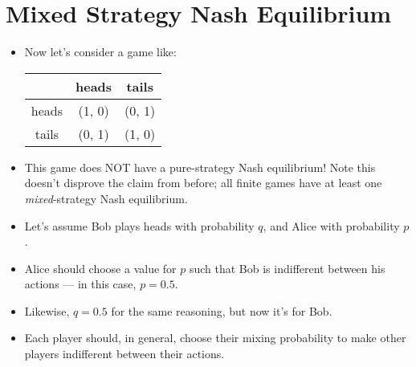 \documentclass{article}
\begin{document}
\section{Mixed Strategy Nash Equilibrium}
\begin{itemize}
    \item Now let's consider a game like:
        \begin{table}[h!]
            \centering
            \begin{tabular}{|c|c|c|}
            \hline
                  & heads  & tails  \\ \hline
            heads & (1, 0) & (0, 1) \\ \hline
            tails & (0, 1) & (1, 0) \\ \hline
            \end{tabular}
        \end{table}
    \item This game does NOT have a pure-strategy Nash equilibrium!  Note this doesn't disprove the claim from before; all finite games have at least one \emph{mixed}-strategy Nash equilibrium.
    \item Let's assume Bob plays heads with probability $q$, and Alice with probability $p$.
    \item Alice should choose a value for $p$ such that Bob is indifferent between his actions --- in this case, $p = 0.5$.
    \item Likewise, $q = 0.5$ for the same reasoning, but now it's for Bob.
    \item Each player should, in general, choose their mixing probability to make other players indifferent between their actions.
\end{itemize}
\end{document}
